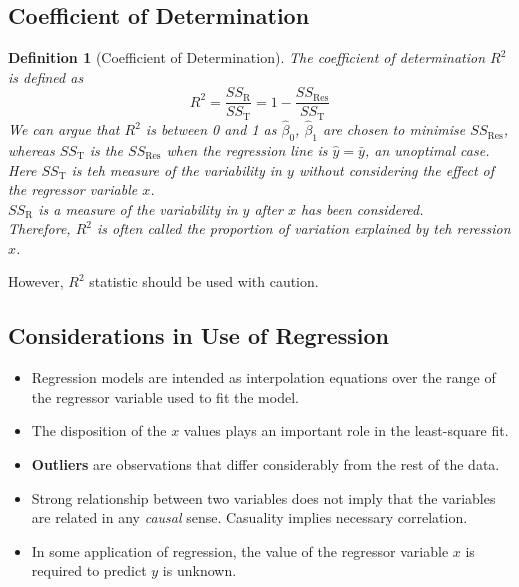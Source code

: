 \documentclass[11pt]{article}
\newtheorem{definition}{Definition}[section]
\theoremstyle{definition}
\begin{document}
\subsection{Coefficient of Determination}
\begin{definition}[Coefficient of Determination]
\normalfont The coefficient of determination $R^2$is defined as
\[
R^2 = \frac{SS_\text{R}}{SS_\text{T}} = 1-\frac{SS_\text{Res}}{SS_\text{T}}
\]
We can argue that $R^2$ is between 0 and 1 as $\hat{\beta}_0$, $\hat{\beta}_1$ are chosen to minimise $SS_\text{Res}$, whereas $SS_\text{T}$ is the $SS_\text{Res}$ when the regression line is $\hat{y} = \bar{y}$, an unoptimal case.\\
Here $SS_\text{T}$ is teh measure of the variability in $y$ without considering the effect of the regressor variable $x$.\\
$SS_\text{R}$ is a measure of the variability in $y$ after $x$ has been considered.\\
Therefore, $R^2$ is often called the proportion of variation explained by teh reression $x$.
\end{definition}
However, $R^2$ statistic should be used with caution.
\subsection{Considerations in Use of Regression}
\begin{itemize}
  \item Regression models are intended as interpolation equations over the range of the regressor variable used to fit the model.
  \item The disposition of the $x$ values plays an important role in the least-square fit.
  \item \textbf{Outliers} are observations that differ considerably from the rest of the data.
  \item Strong relationship between two variables does not imply that the variables are related in any \textit{causal} sense. Casuality implies necessary correlation.
  \item In some application of regression, the value of the regressor variable $x$ is required to predict $y$ is unknown.
\end{itemize}
\end{document}
